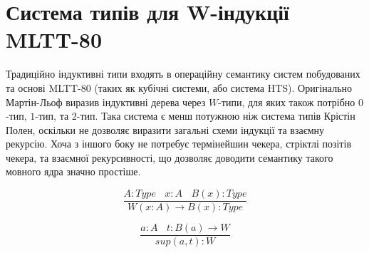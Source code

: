 \newpage
\section{Система типів для W-індукції MLTT-80}
Традиційно індуктивні типи входять в операційну семантику систем побудованих
та основі MLTT-80 (таких як кубічні системи, або система HTS).
Оригінально Мартін-Льоф виразив індуктивні дерева через $W$-типи, для яких
також потрібно $0$-тип, $1$-тип, та $2$-тип. Така система є менш потужною ніж система типів Крістін Полен,
оскільки не дозволяє виразити загальні схеми індукції та взаємну рекурсію. Хоча з іншого
боку не потребує термінейшин чекера, стріктлі позітів чекера, та взаємної рекурсивності,
що дозволяє доводити семантику такого мовного ядра значно простіше.

\begin{equation}
\tag{$W$-formation}
\dfrac
{A:Type\ \ \ \ x:A\ \ \ \ B(x):Type}
{W (x:A) \rightarrow B(x) : Type}
\end{equation}

\begin{equation}
\tag{$W$-intro}
\dfrac
{a:A\ \ \ \ t: B(a) \rightarrow W}
{sup(a,t) : W}
\end{equation}

